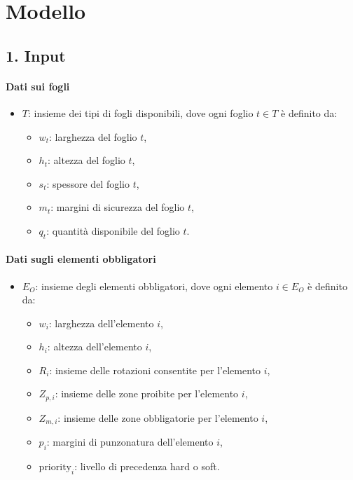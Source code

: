 \section{Modello}

\subsection*{1. Input}

\paragraph*{Dati sui fogli}  
\begin{itemize}
    \item \( T \): insieme dei tipi di fogli disponibili, dove ogni foglio \( t \in T \) è definito da:
    \begin{itemize}
        \item \( w_t \): larghezza del foglio \( t \),
        \item \( h_t \): altezza del foglio \( t \),
        \item \( s_t \): spessore del foglio \( t \),
        \item \( m_t \): margini di sicurezza del foglio \( t \),
        \item \( q_t \): quantità disponibile del foglio \( t \).
    \end{itemize}
\end{itemize}

\paragraph*{Dati sugli elementi obbligatori}  
\begin{itemize}
    \item \( E_O \): insieme degli elementi obbligatori, dove ogni elemento \( i \in E_O \) è definito da:
    \begin{itemize}
        \item \( w_i \): larghezza dell’elemento \( i \),
        \item \( h_i \): altezza dell’elemento \( i \),
        \item \( R_i \): insieme delle rotazioni consentite per l’elemento \( i \),
        \item \( Z_{p,i} \): insieme delle zone proibite per l’elemento \( i \),
        \item \( Z_{m,i} \): insieme delle zone obbligatorie per l’elemento \( i \),
        \item \( p_i \): margini di punzonatura dell’elemento \( i \),
        \item \( \text{priority}_i \): livello di precedenza hard o soft.
    \end{itemize}
\end{itemize}

